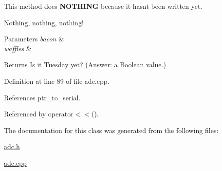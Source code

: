 This method does {\bfseries N\+O\+T\+H\+I\+NG} because it hasn\textquotesingle{}t been written yet. 

Nothing, nothing, nothing! 
\begin{DoxyParams}{Parameters}
{\em bacon} & \\
\hline
{\em waffles} & \\
\hline
\end{DoxyParams}
\begin{DoxyReturn}{Returns}
Is it Tuesday yet? (Answer\+: a Boolean value.) 
\end{DoxyReturn}


Definition at line 89 of file adc.\+cpp.



References ptr\+\_\+to\+\_\+serial.



Referenced by operator$<$$<$().



The documentation for this class was generated from the following files\+:\begin{DoxyCompactItemize}
\item 
\mbox{\hyperlink{adc_8h}{adc.\+h}}\item 
\mbox{\hyperlink{adc_8cpp}{adc.\+cpp}}\end{DoxyCompactItemize}
